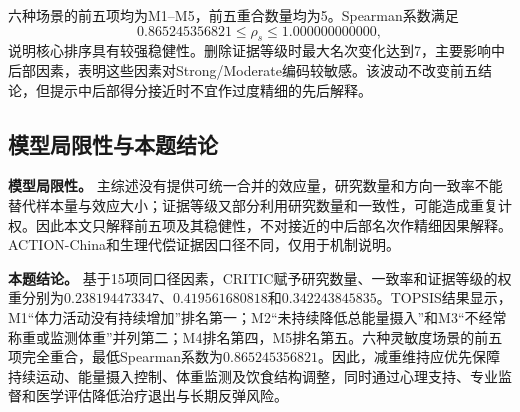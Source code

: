 \begin{table}[H]
\centering
\scriptsize
\caption{六种场景下的排序灵敏度分析}
\label{tab:q2-sensitivity}
\end{table}

六种场景的前五项均为M1--M5，前五重合数量均为5。Spearman系数满足
\[
0.865245356821\leq \rho_s\leq 1.000000000000,
\]
说明核心排序具有较强稳健性。删除证据等级时最大名次变化达到7，主要影响中后部因素，表明这些因素对Strong/Moderate编码较敏感。该波动不改变前五结论，但提示中后部得分接近时不宜作过度精细的先后解释。

\subsection{模型局限性与本题结论}

\textbf{模型局限性。} 主综述没有提供可统一合并的效应量，研究数量和方向一致率不能替代样本量与效应大小；证据等级又部分利用研究数量和一致性，可能造成重复计权。因此本文只解释前五项及其稳健性，不对接近的中后部名次作精细因果解释。ACTION-China和生理代偿证据因口径不同，仅用于机制说明。

\textbf{本题结论。} 基于15项同口径因素，CRITIC赋予研究数量、一致率和证据等级的权重分别为$0.238194473347$、$0.419561680818$和$0.342243845835$。TOPSIS结果显示，M1“体力活动没有持续增加”排名第一；M2“未持续降低总能量摄入”和M3“不经常称重或监测体重”并列第二；M4排名第四，M5排名第五。六种灵敏度场景的前五项完全重合，最低Spearman系数为$0.865245356821$。因此，减重维持应优先保障持续运动、能量摄入控制、体重监测及饮食结构调整，同时通过心理支持、专业监督和医学评估降低治疗退出与长期反弹风险。
